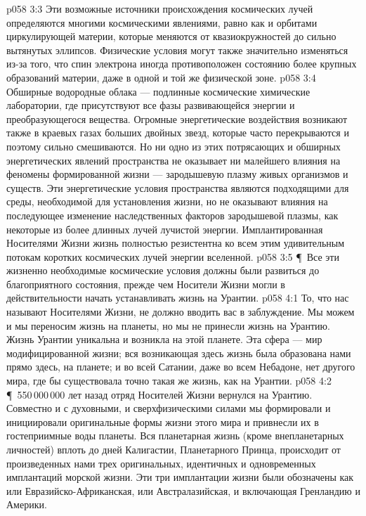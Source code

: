 \vs p058 3:3 Эти возможные источники происхождения космических лучей определяются многими космическими явлениями, равно как и орбитами циркулирующей материи, которые меняются от квазиокружностей до сильно вытянутых эллипсов. Физические условия могут также значительно изменяться из\hyp{}за того, что спин электрона иногда противоположен состоянию более крупных образований материи, даже в одной и той же физической зоне.
\vs p058 3:4 Обширные водородные облака --- подлинные космические химические лаборатории, где присутствуют все фазы развивающейся энергии и преобразующегося вещества. Огромные энергетические воздействия возникают также в краевых газах больших двойных звезд, которые часто перекрываются и поэтому сильно смешиваются. Но ни одно из этих потрясающих и обширных энергетических явлений пространства не оказывает ни малейшего влияния на феномены формированной жизни --- зародышевую плазму живых организмов и существ. Эти энергетические условия пространства являются подходящими для среды, необходимой для установления жизни, но не оказывают влияния на последующее изменение наследственных факторов зародышевой плазмы, как некоторые из более длинных лучей лучистой энергии. Имплантированная Носителями Жизни жизнь полностью резистентна ко всем этим удивительным потокам коротких космических лучей энергии вселенной.
\vs p058 3:5 \P\ Все эти жизненно необходимые космические условия должны были развиться до благоприятного состояния, прежде чем Носители Жизни могли в действительности начать устанавливать жизнь на Урантии.
\vs p058 4:1 То, что нас называют Носителями Жизни, не должно вводить вас в заблуждение. Мы можем и мы переносим жизнь на планеты, но мы не принесли жизнь на Урантию. Жизнь Урантии уникальна и возникла на этой планете. Эта сфера --- мир модифицированной жизни; вся возникающая здесь жизнь была образована нами прямо здесь, на планете; и во всей Сатании, даже во всем Небадоне, нет другого мира, где бы существовала точно такая же жизнь, как на Урантии.
\vs p058 4:2 \P\ 550\,000\,000 лет назад отряд Носителей Жизни вернулся на Урантию. Совместно и с духовными, и сверхфизическими силами мы формировали и инициировали оригинальные формы жизни этого мира и привнесли их в гостеприимные воды планеты. Вся планетарная жизнь (кроме внепланетарных личностей) вплоть до дней Калигастии, Планетарного Принца, происходит от произведенных нами трех оригинальных, идентичных и одновременных имплантаций морской жизни. Эти три имплантации жизни были обозначены как  или Евразийско\hyp{}Африканская,  или Австралазийская, и  включающая Гренландию и Америки.

